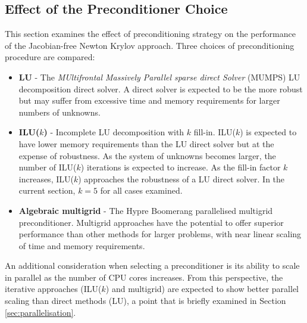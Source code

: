 \documentclass[sn-mathphys,Numbered]{sn-jnl}%
\begin{document}
\subsection{Effect of the Preconditioner Choice}
\label{sec:preconditioner}
This section examines the effect of preconditioning strategy on the performance of the Jacobian-free Newton Krylov approach.
Three choices of preconditioning procedure are compared:
\begin{itemize}
	\item \textbf{LU} - The \emph{MUltifrontal Massively Parallel sparse direct Solver} (MUMPS) \citep{MUMPS:1, MUMPS:2} LU decomposition direct solver. A direct solver is expected to be the more robust but may suffer from excessive time and memory requirements for larger numbers of unknowns.
	\item \textbf{ILU($k$)} - Incomplete LU decomposition with $k$ fill-in. ILU($k$) is expected to have lower memory requirements than the LU direct solver but at the expense of robustness.
	As the system of unknowns becomes larger, the number of ILU($k$) iterations is expected to increase. As the fill-in factor $k$ increases, ILU($k$) approaches the robustness of a LU direct solver. In the current section, $k = 5$ for all cases examined.
	\item \textbf{Algebraic multigrid} - The Hypre Boomerang \citep{hypre} parallelised multigrid preconditioner. Multigrid approaches have the potential to offer superior performance than other methods for larger problems, with near linear scaling of time and memory requirements.
\end{itemize}

An additional consideration when selecting a preconditioner is its ability to scale in parallel as the number of CPU cores increases.
From this perspective, the iterative approaches (ILU($k$) and multigrid) are expected to show better parallel scaling than direct methods (LU), a point that is briefly examined in Section \ref{sec:parallelisation}.
\end{document}
